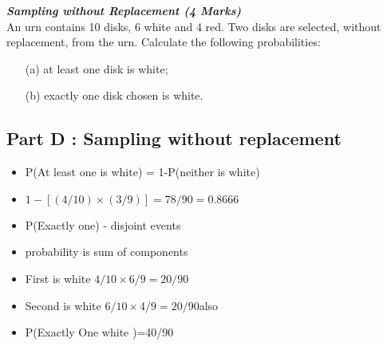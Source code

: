 \newpage
\item[(d)]  \textbf{\textit{Sampling without Replacement (4 Marks)}}\\
An urn contains 10 disks, 6 white and 4 red.  Two disks are selected, without replacement, from the urn.  Calculate the following probabilities:
 
\begin{itemize}
\item[(a)]  at least one disk is white;
\item[(b)]   exactly one disk chosen is white.
\end{itemize}
 
 
 
 \subsection*{Part D : Sampling without replacement}

\begin{itemize}
\item P(At least one is white) = 1-P(neither is white)
\item $1- \left[(4/10)\times (3/9)\right]  = 78/90 = 0.8666$
\item P(Exactly one) - disjoint events
\item probability is sum of components
\item First is white $4/10 \times 6/9 =20/90$
\item Second is white $6/10 \times 4/9 =20/90 $also
\item P(Exactly One white )=40/90
\end{itemize}
